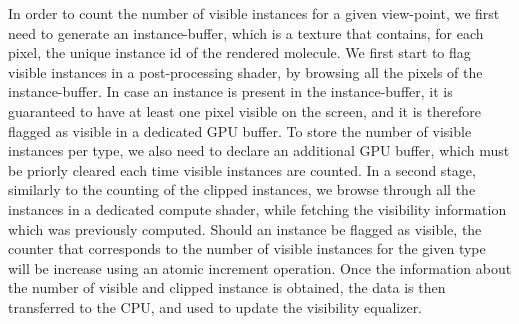 In order to count the number of visible instances for a given view-point, we first need to generate an instance-buffer, which is a texture that contains, for each pixel, the unique instance id of the rendered molecule.
We first start to flag visible instances in a post-processing shader, by browsing all the pixels of the instance-buffer.
In case an instance is present in the instance-buffer, it is guaranteed to have at least one pixel visible on the screen, and it is therefore flagged as visible in a dedicated GPU buffer.
To store the number of visible instances per type, we also need to declare an additional GPU buffer, which must be priorly cleared each time visible instances are counted.
In a second stage, similarly to the counting of the clipped instances, we browse through all the instances in a dedicated compute shader, while fetching the visibility information which was previously computed.
Should an instance be flagged as visible, the counter that corresponds to the number of visible instances for the given type will be increase using an atomic increment operation.
Once the information about the number of visible and clipped instance is obtained, the data is then transferred to the CPU, and used to update the visibility equalizer.

